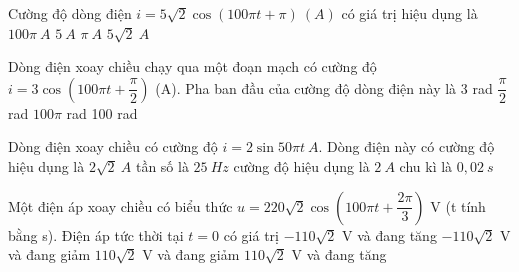 \begin{vidu}%
	 Cường độ dòng điện $i=5\sqrt{2}\cos (100\pi t+\pi)\ (A)$ có giá trị hiệu dụng là
	\choice
	{$100\pi\ A$}
	{\True $5\ A$}
	{$\pi\ A$}
	{$5\sqrt{2}\ A$}	
	\loigiai{
		\begin{itemize}
			\item 
		\end{itemize}	
	}
\end{vidu}
\begin{vidu}%
	 Dòng điện xoay chiều chạy qua một đoạn mạch có cường độ $i=3\cos(100\pi t+\dfrac{\pi}{2})$ (A). Pha ban đầu của cường độ dòng điện này là
	\choice
	{3 rad}
	{\True $\dfrac{\pi}{2}$ rad}
	{$100\pi$ rad}
	{100 rad}
\end{vidu}
\begin{vidu} %
	Dòng điện xoay chiều có cường độ $i=2\sin50\pi t\ A$. Dòng điện này có
	\choice
	{cường độ hiệu dụng là $2\sqrt{2}\ A$}
	{\True tần số là $25\ Hz$}
	{cường độ hiệu dụng là $2\ A$}
	{chu kì là $0,02\ s$}
\end{vidu}
\begin{vidu}%
	Một điện áp xoay chiều có biểu thức $u=220\sqrt{2}\cos  \left( 100\pi t+\dfrac{2\pi}{3} \right)$ V (t tính bằng s). Điện áp tức thời tại $t = 0$ có giá trị
	\choice
	{$-110\sqrt{2}$ V và đang tăng}
	{\True $-110\sqrt{2}$ V  và đang giảm}
	{$110\sqrt{2}$ V  và đang giảm}
	{$110\sqrt{2}$ V và đang tăng}
\end{vidu}
